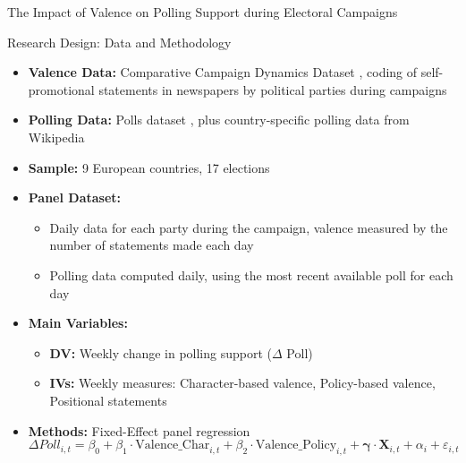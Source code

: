 \documentclass[9pt, aspectratio=169]{beamer}
\newcommand{\customcite}[1]{\textcolor{blue}{\footnotesize\parencite{#1}}}
\begin{document}
\begin{section}{The Impact of Valence on Polling Support during Electoral Campaigns}
\begin{frame}{Research Design: Data and Methodology}
    \begin{itemize}
        \item \textbf{Valence Data:} Comparative Campaign Dynamics Dataset \customcite{debussomer-topcu2018comparative}, coding of self-promotional statements in newspapers by political parties during campaigns \vspace{0.2cm}
        \item \textbf{Polling Data:} Polls dataset \customcite{Jennings2018}, plus country-specific polling data from Wikipedia \vspace{0.2cm}
        \item \textbf{Sample:} 9 European countries, 17 elections \vspace{0.2cm}
        \item \textbf{Panel Dataset:} 
        \begin{itemize}
            \item Daily data for each party during the campaign, valence measured by the number of statements made each day \vspace{0.2cm}
            \item Polling data computed daily, using the most recent available poll for each day
        \end{itemize} \vspace{0.2cm}
        \item \textbf{Main Variables:} 
        \begin{itemize}
            \item \textbf{DV:} Weekly change in polling support ($\Delta$ Poll) \vspace{0.2cm}
            \item \textbf{IVs:} Weekly measures: Character-based valence, Policy-based valence, Positional statements
        \end{itemize} \vspace{0.2cm}
        \item \textbf{Methods:} Fixed-Effect panel regression \vspace{0.2cm}
        \begin{equation*}
            \Delta Poll_{i,t} = \beta_0 + \beta_1 \cdot \text{Valence\_Char}_{i,t} + \beta_2 \cdot \text{Valence\_Policy}_{i,t} + \boldsymbol{\gamma} \cdot \mathbf{X}_{i,t} + \alpha_i + \varepsilon_{i,t}
        \end{equation*}
    \end{itemize}
\end{frame}


\end{section}
\end{document}
